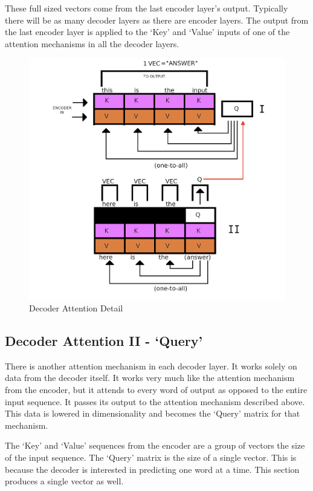 These full sized vectors come from the last encoder layer's output. Typically there will be as many decoder layers as there are encoder layers. The output from the last encoder layer is applied to the `Key' and `Value' inputs of one of the attention mechanisms in all the decoder layers.
\begin{figure}[H]
	\begin{center}
		
		
		\includegraphics[scale=0.75]{diagram-graph-decoder-flow-a}
	\end{center}
	\caption[Decoder Attention Detail]{Decoder Attention Detail}
	
	
\end{figure}


\subsection{Decoder Attention II - `Query'}
There is another attention mechanism in each decoder layer. It works solely on data from the decoder itself. It works very much like the attention mechanism from the encoder, but it attends to every word of output as opposed to the entire input sequence. It passes its output to the attention mechanism described above. This data is lowered in dimensionality and becomes the `Query' matrix for that mechanism. 

The `Key' and `Value' sequences from the encoder are a group of vectors the size of the input sequence. The `Query' matrix is the size of a single vector. This is because the decoder is interested in predicting one word at a time. This section produces a single vector as well.


